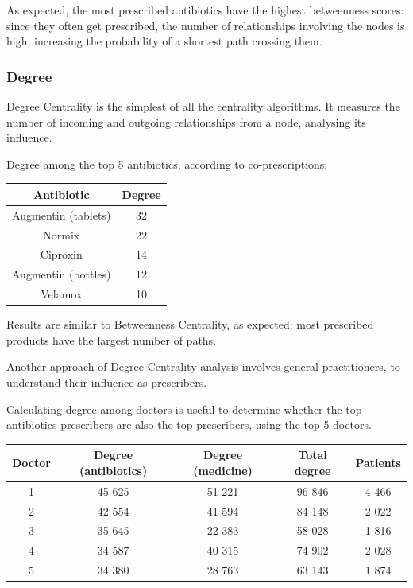 As expected, the most prescribed antibiotics have the highest betweenness scores: since they often get prescribed, the number of relationships involving the nodes is high, increasing the probability of a shortest path crossing them.

\subsubsection{Degree}
Degree Centrality is the simplest of all the centrality algorithms. It measures the number of incoming and outgoing relationships from a node, analysing its influence.

Degree among the top 5 antibiotics, according to co-prescriptions:
\begin{center}
	\begin{tabular}{c|c}
		Antibiotic & Degree \\
		\hline
		Augmentin (tablets) & 32 \\
		\hline
		Normix & 22 \\
		\hline
		Ciproxin & 14 \\
		\hline
		Augmentin (bottles) & 12 \\
		\hline
		Velamox & 10 \\
	\end{tabular}
\end{center}

Results are similar to Betweenness Centrality, as expected: most prescribed products have the largest number of paths.

Another approach of Degree Centrality analysis involves general practitioners, to understand their influence as prescribers.

Calculating degree among doctors is useful to determine whether the top antibiotics prescribers are also the top prescribers, using the top 5 doctors.

\begin{center}
	\begin{tabular}{c|c|c|c|c}
		Doctor & Degree (antibiotics) & Degree (medicine) & Total degree & Patients \\
		\hline
		1 & 45 625 & 51 221 & 96 846 & 4 466 \\
		\hline
		2 & 42 554 & 41 594 & 84 148 & 2 022 \\
		\hline
		3 & 35 645 & 22 383 & 58 028 & 1 816 \\
		\hline
		4 & 34 587 & 40 315 & 74 902 & 2 028 \\
		\hline
		5 & 34 380 & 28 763 & 63 143 & 1 874
	\end{tabular}
\end{center}

